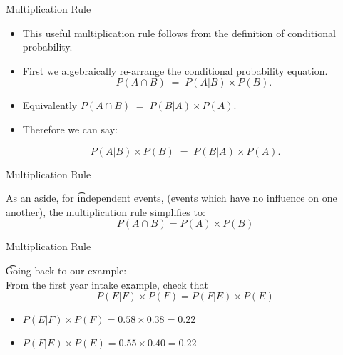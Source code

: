 {
	{Multiplication Rule}

\vspace{-0.5cm}
\begin{itemize}
\item This useful multiplication rule follows from the definition of conditional probability.
\item First we algebraically re-arrange the conditional probability equation.
\[ P(A \cap B) \;=\; P(A|B)\times P(B). \]
\item Equivalently $ P(A \cap B) \;=\; P(B|A)\times P(A). $
\item Therefore we can say:
\end{itemize}
\[ P(A|B)\times P(B) \;=\; P(B|A)\times P(A). \]
}
{
	{Multiplication Rule}

\vspace{-1cm}
As an aside, for \t{independent events}, (events which have no influence on one another), the multiplication rule simplifies to:
\[P(A \cap B)  = P(A)\times P(B) \]
}
{
	{Multiplication Rule}

\vspace{-1cm}
\t{Going back to our example:}\\
From the first year intake example, check that
\[ P(E|F)\times P(F) = P(F|E)\times P(E)\]
\begin{itemize}
\item $P(E|F)\times P(F) = 0.58 \times 0.38  = 0.22$
\item $P(F|E)\times P(E) = 0.55 \times 0.40  = 0.22$
\end{itemize}
}